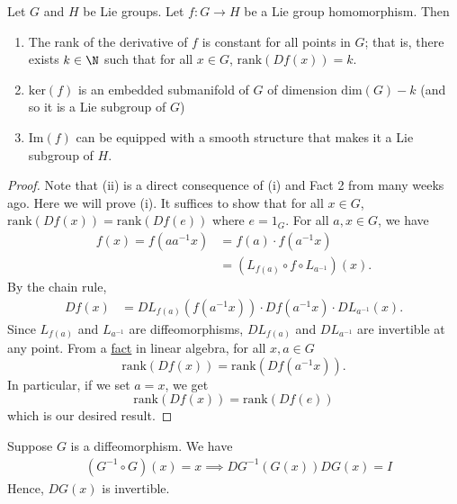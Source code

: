 \begin{theorem}
   Let \( G  \) and \( H  \) be Lie groups. Let \( f : G \to H  \) be a Lie group homomorphism. Then 
   \begin{enumerate}
       \item[(i)] The rank of the derivative of \( f  \) is constant for all points in \( G  \); that is, there exists \( k \in \N  \) such that for all \( x \in G  \), \( \text{rank}(D f (x)) = k   \).
        \item[(ii)] \( \text{ker}(f) \) is an embedded submanifold of \( G  \) of dimension \( \text{dim}(G) - k  \) (and so it is a Lie subgroup of \( G \)) 
        \item[(iii)] \( \text{Im}(f)  \) can be equipped with a smooth structure that makes it a Lie subgroup of \( H  \).
   \end{enumerate}
\end{theorem}
\begin{proof}
    Note that (ii) is a direct consequence of (i) and Fact 2 from many weeks ago. Here we will prove (i). It suffices to show that for all \( x \in G  \), \( \text{rank}(Df(x)) = \text{rank}(Df(e)) \) where \( e = {1}_{G} \). For all \( a,x \in G  \), we have 
    \begin{align*}
        f(x) = f(aa^{-1} x) &= f(a) \cdot f(a^{-1}x) \\
                            &= ({L}_{f(a) } \circ f \circ L_{a^{-1}} )(x).
    \end{align*}
    By the chain rule, 
    \begin{align*}
        Df(x) &= D {L}_{f(a)}(f(a^{-1}x)) \cdot D f (a^{-1} x ) \cdot D{L}_{a^{-1}}(x). 
    \end{align*}
    Since \( {L}_{f(a)}  \) and \( {L}_{a^{-1}} \) are diffeomorphisms, \( D {L}_{f(a)} \) and \( D {L}_{a^{-1}} \) are invertible at any point. From a {\hyperref[Fact from Linear Algebra]{fact}}  in linear algebra, for all \( x , a \in G  \) 
    \[  \text{rank}(Df(x)) = \text{rank}(Df(a^{-1}x)). \]
    In particular, if we set \( a = x  \), we get
    \[  \text{rank}(Df(x))  = \text{rank}(Df(e))\]
    which is our desired result.
\end{proof}

\begin{remark}
    Suppose \( G  \) is a diffeomorphism. We have 
    \begin{align*}
        &(G^{-1} \circ G )(x) = x  
        \implies D G^{-1}(G(x)) DG(x) = I
    \end{align*}
    Hence, \( DG(x) \) is invertible.
\end{remark}

